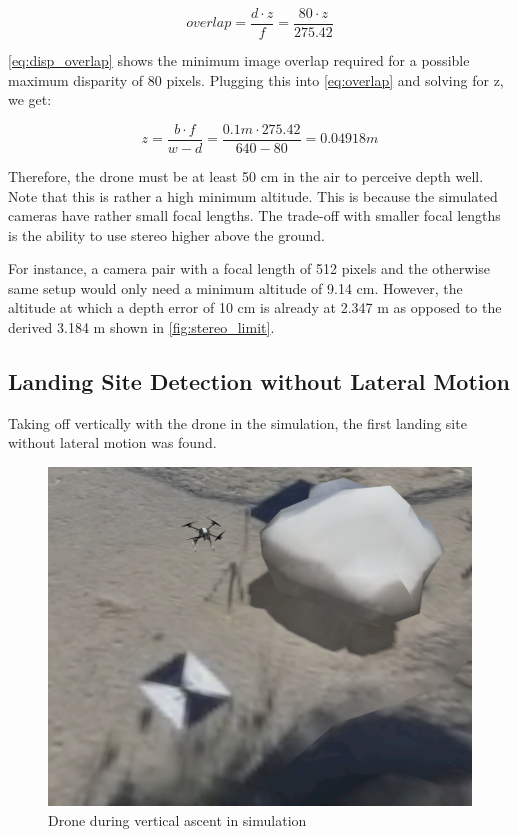 \begin{equation}
    overlap = \frac{d \cdot z}{f} = \frac{80 \cdot z}{275.42}
    \label{eq:disp_overlap}
\end{equation}

\cref{eq:disp_overlap} shows the minimum image overlap required for a possible maximum disparity of 80 pixels. Plugging this into \cref{eq:overlap} and solving for z, we get:

\begin{equation}
    z = \frac{b \cdot f}{w - d} = \frac{0.1 m \cdot 275.42}{640 - 80} = 0.04918 m
\end{equation}

Therefore, the drone must be at least 50 cm in the air to perceive depth well. Note that this is rather a high minimum altitude. This is because the simulated cameras have rather small focal lengths. The trade-off with smaller focal lengths is the ability to use stereo higher above the ground. 

For instance, a camera pair with a focal length of 512 pixels and the otherwise same setup would only need a minimum altitude of 9.14 cm. However, the altitude at which a depth error of 10 cm is already at  2.347 m as opposed to the derived
3.184 m shown in \cref{fig:stereo_limit}.

\subsection{Landing Site Detection without Lateral Motion}

Taking off vertically with the drone in the simulation, the first landing site without lateral motion was found.

\begin{figure}
    \centering
    \includegraphics[scale=0.34]{images/stereo_camera_depth/ascent_sim.png}
    \caption{Drone during vertical ascent in simulation}
\end{figure}

